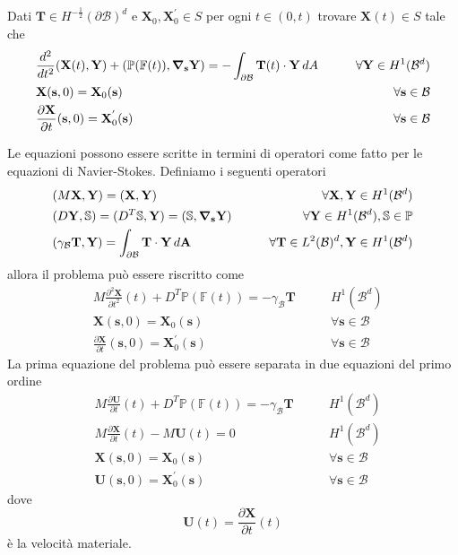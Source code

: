 Dati $\mathbf{T} \in H^{-\frac{1}{2}}(\partial\mathcal{B})^d$ e $\mathbf{X}_0,\mathbf{X}^{'}_0 \in S$ per ogni $t \in (0,t)$ trovare $\mathbf{X}(t) \in S$ tale che 
\begin{align*}
&\frac{d^2}{dt^2}\ps{\mathbf{X}(t)}{\mathbf{Y}} + \ps{\mathbb{P}(\mathbb{F}(t))}{\Nabla_\mathbf{s} \mathbf{Y}} = -\int_{\partial\mathcal{B}}\mathbf{T}(t)\cdot\mathbf{Y}\,dA\qquad&\forall\mathbf{Y}\in H^1(\mathcal{B}^d)\\
&\mathbf{X}(\mathbf{s},0)=\mathbf{X}_0(\mathbf{s})\qquad&\forall\mathbf{s}\in\mathcal{B}\\
&\frac{\partial\mathbf{X}}{\partial t}(\mathbf{s},0)=\mathbf{X}^{'}_0(\mathbf{s})&\forall\mathbf{s}\in\mathcal{B}
\end{align*}

Le equazioni possono essere scritte in termini di operatori come fatto per le equazioni di Navier-Stokes.
Definiamo i seguenti operatori
\begin{align*}
&\ps{M\mathbf{X}}{\mathbf{Y}}=\ps{\mathbf{X}}{\mathbf{Y}}\qquad&\forall\mathbf{X},\mathbf{Y}\in H^1(\mathcal{B}^d) \\
&\ps{D\mathbf{Y}}{\mathbb{S}}=\ps{D^T\mathbb{S}}{\mathbf{Y}}=\ps{\mathbb{S}}{\Nabla_{\mathbf{s}}\mathbf{Y}}\qquad&\forall\mathbf{Y}\in H^1(\mathcal{B}^d),\mathbb{S}\in\mathbb{P}\\
&\ps{\gamma_{\mathcal{B}}\mathbf{T}}{\mathbf{Y}}=\int_{\partial \mathcal{B}}\mathbf{T}\cdot\mathbf{Y}\,d\mathbf{A}\qquad&\forall\mathbf{T}\in L^2(\mathcal{B})^d,\mathbf{Y}\in H^1(\mathcal{B}^d) \\
\end{align*}
allora il problema può essere riscritto come
\begin{align*}
&M\frac{\partial^2 \mathbf{X}}{\partial t^2}(t)+D^T\mathbb{P}(\mathbb{F}(t))=-\gamma_{\mathcal{B}}\mathbf{T}
\qquad&H^1(\mathcal{B}^d) \\
&\mathbf{X}(\mathbf{s},0)=\mathbf{X}_0(\mathbf{s})\qquad&\forall\mathbf{s}\in\mathcal{B}\\
&\frac{\partial\mathbf{X}}{\partial t}(\mathbf{s},0)=\mathbf{X}^{'}_0(\mathbf{s})&\forall\mathbf{s}\in\mathcal{B}
\end{align*}
La prima equazione del problema può essere separata in due equazioni del primo ordine
\begin{align*}
&M\frac{\partial \mathbf{U}}{\partial t}(t)+D^T\mathbb{P}(\mathbb{F}(t))=-\gamma_{\mathcal{B}}\mathbf{T}
\qquad&H^1(\mathcal{B}^d) \\
&M\frac{\partial \mathbf{X}}{\partial t}(t)-M\mathbf{U}(t)=0
\qquad&H^1(\mathcal{B}^d) \\
&\mathbf{X}(\mathbf{s},0)=\mathbf{X}_0(\mathbf{s})\qquad&\forall\mathbf{s}\in\mathcal{B}\\
&\mathbf{U}(\mathbf{s},0)=\mathbf{X}^{'}_0(\mathbf{s})&\forall\mathbf{s}\in\mathcal{B}
\end{align*}
dove
\begin{equation*}
\mathbf{U}(t) = \frac{\partial \mathbf{X}}{\partial t}(t)
\end{equation*}
è la velocità materiale.

